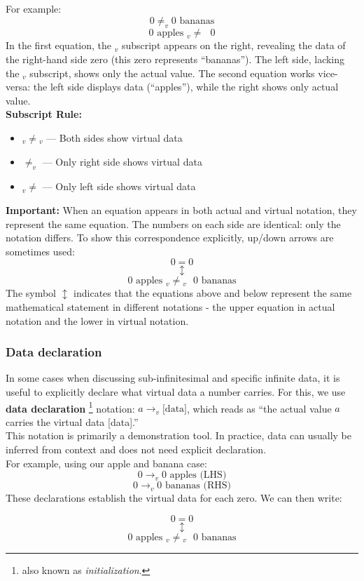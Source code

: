 \documentclass{article}
\begin{document}
For example:
$$0 \neq_v 0 \text{ bananas}$$
$$0 \text{ apples } {}_v{\neq}\text{ }  0$$ In the first equation, the $_v$ subscript appears on the right, revealing the data of the right-hand side zero (this zero represents ``bananas''). The left side, lacking the $_v$ subscript, shows only the actual value. The second equation works vice-versa: the left side displays data (``apples''), while the right shows only actual value.\\\textbf{Subscript Rule:} 
\begin{itemize}
\item ${}_v{\neq}{}_v$ — Both sides show virtual data
\item $\neq_v$ — Only right side shows virtual data  
\item ${}_v{\neq}$ — Only left side shows virtual data
\end{itemize}\textbf{Important:} When an equation appears in both actual and virtual notation, they represent the same equation. The numbers on each side are identical: only the notation differs. To show this correspondence explicitly, up/down arrows are sometimes used:
$$0=0$$ 
$$\updownarrow$$
$$0 \text{ apples }{}_v{\neq}{}_v \text{ }0\text{ bananas}$$The symbol $\updownarrow$ indicates that the equations above and below represent the same mathematical statement in different notations - the upper equation in actual notation and the lower in virtual notation. 
\subsubsection{Data declaration}

In some cases when discussing sub-infinitesimal and specific infinite data, it is useful to explicitly declare what virtual data a number carries. For this, we use \textbf{data declaration} \footnote{also known as \textit{initialization}.} notation: $a \to_v \text{[data]}$, which reads as ``the actual value $a$ carries the virtual data [data].''\\This notation is primarily a demonstration tool. In practice, data can usually be inferred from context and does not need explicit declaration.\\For example, using our apple and banana case:
$$0 \to_v 0 \text{ apples (LHS)} $$
$$0 \to_v 0 \text{ bananas (RHS)}$$These declarations establish the virtual data for each zero. We can then write:

$$0 = 0$$
$$\updownarrow$$
$$0 \text{ apples } {}_v{\neq}{}_v \text{ }0 \text{ bananas}$$
\end{document}
